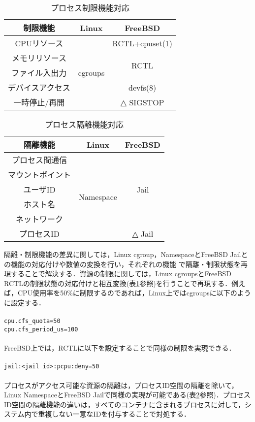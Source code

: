 \documentclass[10pt]{jarticle}
\begin{document}
\begin{table}[t]
  \caption{プロセス制限機能対応}
  \label{tb:limit}
  \begin{center}
  \begin{tabular}{|c|c|c|} \hline
    制限機能 & Linux & FreeBSD \\ \hline \hline
    CPUリソース & \multirow{5}{*}{cgroups} &  RCTL+cpuset(1) \\ \cline{1-1} \cline{3-3}
    メモリリソース &  &  \multirow{2}{*}{RCTL} \\ \cline{1-1}
    ファイル入出力 &  &  \\ \cline{1-1} \cline{3-3}
    デバイスアクセス &  & devfs(8) \\ \cline{1-1} \cline{3-3}
    一時停止/再開 &  & △ SIGSTOP \\ \hline
  \end{tabular}
\end{center}
\end{table}

\begin{table}[t]
  \caption{プロセス隔離機能対応}
  \label{tb:isolation}
  \begin{center}
  \begin{tabular}{|c|c|c|} \hline
    隔離機能 & Linux & FreeBSD \\ \hline \hline
    プロセス間通信 & \multirow{6}{*}{Namespace} &  \multirow{5}{*}{Jail} \\ \cline{1-1}
    マウントポイント &  & \\ \cline{1-1}
    ユーザID &  &  \\ \cline{1-1}
    ホスト名 &  & \\ \cline{1-1}
    ネットワーク &  & \\ \cline{1-1} \cline{3-3}
    プロセスID &  & △ Jail \\ \hline
  \end{tabular}
\end{center}
\end{table}
隔離・制限機能の差異に関しては，Linux cgroup，NamespaceとFreeBSD Jailとの機能の対応付けや数値の変換を行い，それぞれの機能
で隔離・制限状態を再現することで解決する．資源の制限に関しては，Linux cgroupsとFreeBSD RCTLの制限状態の対応付けと相互変換(表\ref{tb:limit}参照)を行うことで再現する．例え
ば，CPU使用率を50\%に制限するのであれば，Linux上ではcgroupsに以下のように設定する．\\\\
\verb|cpu.cfs_quota=50|\\
\verb|cpu.cfs_period_us=100|\\\\
FreeBSD上では，RCTLに以下を設定することで同様の制限を実現できる．\\\\
\verb|jail:<jail id>:pcpu:deny=50|\\\\
プロセスがアクセス可能な資源の隔離は，プロセスID空間の隔離を除いて，Linux NamespaceとFreeBSD Jailで同様の実現が可能である(表\ref{tb:isolation}参照)．プロセスID空間の隔離機能の違いは，すべてのコンテナに含まれるプロセスに対して，システム内で重複しない一意なIDを付与することで対処する．
\end{document}
